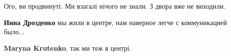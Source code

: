  
 
 
 
 

\qqSecCmt


Ого, ви продвинуті. Ми взагалі нічого не знали. З двора вже не виходили.

\begin{itemize} %
\textbf{Инна Дрозденко} мы жили в центре, нам наверное легче с коммуникацией было...

\textbf{Maryna Krutenko}, так ми теж в центрі.
\end{itemize} %
